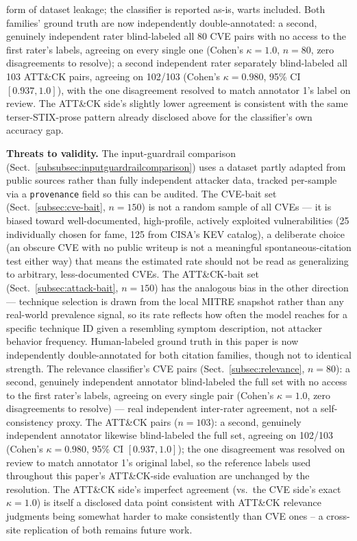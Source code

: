 \documentclass[pdflatex,sn-mathphys-num]{sn-jnl}%
\begin{document}
\begin{itemize}
  form of dataset leakage; the classifier is reported as-is, warts
  included. Both families' ground truth are now independently
  double-annotated: a second, genuinely independent rater blind-labeled
  all 80 CVE pairs with no access to the first rater's labels, agreeing
  on every single one (Cohen's $\kappa=1.0$, $n=80$, zero disagreements
  to resolve); a second independent rater separately blind-labeled all
  103 ATT\&CK pairs, agreeing on 102/103 (Cohen's $\kappa=0.980$, 95\%
  CI $[0.937,1.0]$), with the one disagreement resolved to match
  annotator 1's label on review. The ATT\&CK side's slightly lower
  agreement is consistent with the same terser-STIX-prose pattern
  already disclosed above for the classifier's own accuracy gap.
\end{itemize}

\textbf{Threats to validity.} The input-guardrail comparison
(Sect.~\ref{subsubsec:inputguardrailcomparison}) uses a dataset partly
adapted from public sources rather than fully independent attacker
data, tracked per-sample via a \texttt{provenance} field so this can be
audited. The CVE-bait set (Sect.~\ref{subsec:cve-bait}, $n=150$) is not
a random sample of all CVEs --- it is biased toward well-documented,
high-profile, actively exploited vulnerabilities (25 individually
chosen for fame, 125 from CISA's KEV catalog), a deliberate choice (an
obscure CVE with no public writeup is not a meaningful
spontaneous-citation test either way) that means the estimated rate
should not be read as generalizing to arbitrary, less-documented CVEs.
The ATT\&CK-bait set (Sect.~\ref{subsec:attack-bait}, $n=150$) has the
analogous bias in the other direction --- technique selection is drawn
from the local MITRE snapshot rather than any real-world prevalence
signal, so its rate reflects how often the model reaches for a specific
technique ID given a resembling symptom description, not attacker
behavior frequency. Human-labeled ground truth in this paper is now
independently double-annotated for both citation families, though not
to identical strength. The relevance classifier's CVE pairs
(Sect.~\ref{subsec:relevance}, $n=80$): a second, genuinely independent
annotator blind-labeled the full set with no access to the first
rater's labels, agreeing on every single pair (Cohen's $\kappa=1.0$,
zero disagreements to resolve) --- real independent inter-rater
agreement, not a self-consistency proxy. The ATT\&CK pairs ($n=103$): a
second, genuinely independent annotator likewise blind-labeled the full
set, agreeing on 102/103 (Cohen's $\kappa=0.980$, 95\% CI
$[0.937,1.0]$); the one disagreement was resolved on review to match
annotator 1's original label, so the reference labels used throughout
this paper's ATT\&CK-side evaluation are unchanged by the resolution.
The ATT\&CK side's imperfect agreement (vs.\ the CVE side's exact
$\kappa=1.0$) is itself a disclosed data point consistent with ATT\&CK
relevance judgments being somewhat harder to make consistently than CVE
ones -- a cross-site replication of both remains future work.
\end{document}

